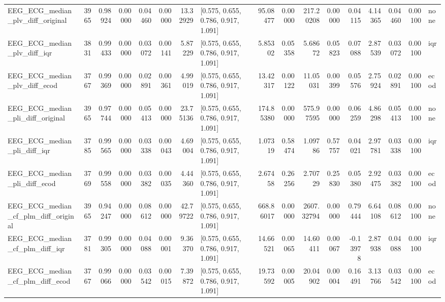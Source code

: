 \begin{tabular}{lrrrrrrlrrrrrrrrl}
EEG\_ECG\_median\_plv\_diff\_original & 3965 & 0.98924 & 0.00000 & 0.04460 & 0.00000 & 13.32929 & [0.575, 0.655, 0.786, 0.917, 1.091] & 95.08477 & 0.00000 & 217.20208 & 0.00000 & 0.04115 & 4.14365 & 0.04460 & 0.00100 & none \\
EEG\_ECG\_median\_plv\_diff\_iqr & 3831 & 0.99433 & 0.00000 & 0.03072 & 0.00141 & 5.87229 & [0.575, 0.655, 0.786, 0.917, 1.091] & 5.85302 & 0.05358 & 5.68672 & 0.05823 & 0.07088 & 2.87539 & 0.03072 & 0.00100 & iqr \\
EEG\_ECG\_median\_plv\_diff\_ecod & 3767 & 0.99369 & 0.00000 & 0.02891 & 0.00361 & 4.99019 & [0.575, 0.655, 0.786, 0.917, 1.091] & 13.42317 & 0.00122 & 11.05031 & 0.00399 & 0.05576 & 2.75924 & 0.02891 & 0.00100 & ecod \\
EEG\_ECG\_median\_pli\_diff\_original & 3965 & 0.97744 & 0.00000 & 0.05413 & 0.00000 & 23.75136 & [0.575, 0.655, 0.786, 0.917, 1.091] & 174.85380 & 0.00000 & 575.97595 & 0.00000 & 0.06259 & 4.86298 & 0.05413 & 0.00100 & none \\
EEG\_ECG\_median\_pli\_diff\_iqr & 3785 & 0.99565 & 0.00000 & 0.03338 & 0.00043 & 4.69004 & [0.575, 0.655, 0.786, 0.917, 1.091] & 1.07319 & 0.58474 & 1.09786 & 0.57757 & 0.04021 & 2.97781 & 0.03338 & 0.00100 & iqr \\
EEG\_ECG\_median\_pli\_diff\_ecod & 3769 & 0.99558 & 0.00000 & 0.03382 & 0.00035 & 4.44360 & [0.575, 0.655, 0.786, 0.917, 1.091] & 2.67458 & 0.26256 & 2.70729 & 0.25830 & 0.05380 & 2.92475 & 0.03382 & 0.00100 & ecod \\
EEG\_ECG\_median\_cf\_plm\_diff\_original & 3965 & 0.94247 & 0.00000 & 0.08612 & 0.00000 & 42.79722 & [0.575, 0.655, 0.786, 0.917, 1.091] & 668.86017 & 0.00000 & 2607.32794 & 0.00000 & 0.79444 & 6.64108 & 0.08612 & 0.00100 & none \\
EEG\_ECG\_median\_cf\_plm\_diff\_iqr & 3781 & 0.99305 & 0.00000 & 0.04088 & 0.00001 & 9.36370 & [0.575, 0.655, 0.786, 0.917, 1.091] & 14.66521 & 0.00065 & 14.60411 & 0.00067 & -0.13978 & 2.87938 & 0.04088 & 0.00100 & iqr \\
EEG\_ECG\_median\_cf\_plm\_diff\_ecod & 3767 & 0.99066 & 0.00000 & 0.03542 & 0.00015 & 7.39872 & [0.575, 0.655, 0.786, 0.917, 1.091] & 19.73592 & 0.00005 & 20.04902 & 0.00004 & 0.16491 & 3.13766 & 0.03542 & 0.00100 & ecod \\
\bottomrule
\end{tabular}
